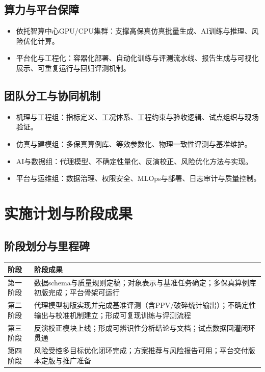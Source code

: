\documentclass[12pt,a4paper,fontset=mac]{ctexart}
\newcommand{\AI}{\textsc{AI}}
\newcommand{\PPV}{\textsc{PPV}}
\begin{document}
\subsection{算力与平台保障}
\begin{itemize}
  \item 依托智算中心GPU/CPU集群：支撑高保真仿真批量生成、\AI{}训练与推理、风险优化计算。
  \item 平台化与工程化：容器化部署、自动化训练与评测流水线、报告生成与可视化展示、可重复运行与回归评测机制。
\end{itemize}

\subsection{团队分工与协同机制}
\begin{itemize}
  \item 机理与工程组：指标定义、工况体系、工程约束与验收逻辑、试点组织与现场验证。
  \item 仿真与建模组：多保真算例库、等效参数化、物理一致性评测与基准维护。
  \item \AI{}与数据组：代理模型、不确定性量化、反演校正、风险优化方法与实现。
  \item 平台与运维组：数据治理、权限安全、MLOps与部署、日志审计与质量控制。
\end{itemize}

\section{实施计划与阶段成果}

\subsection{阶段划分与里程碑}
\begin{table}[h]
\centering
\renewcommand{\arraystretch}{1.2}
\begin{tabularx}{\linewidth}{p{2.4cm}X}
\toprule
\textbf{阶段} & \textbf{阶段成果} \\
\midrule
第一阶段 & 数据schema与质量规则定稿；对象表示与基准任务确定；多保真算例库初版完成；平台骨架可运行 \\
第二阶段 & 代理模型初版实现并完成基准评测（含\PPV/破碎统计输出）；不确定性输出与校准机制建立；形成可复现训练与评测流程 \\
第三阶段 & 反演校正模块上线；形成可辨识性分析结论与文档；试点数据回灌闭环贯通 \\
第四阶段 & 风险受控多目标优化闭环完成；方案推荐与风险报告可用；平台交付版本定版与推广准备 \\
\bottomrule
\end{tabularx}
\end{table}
\end{document}
